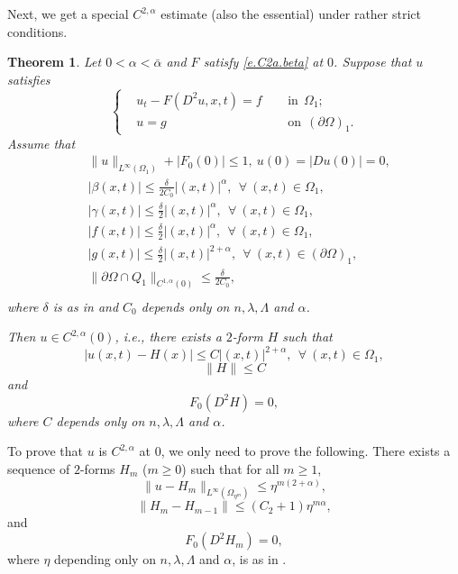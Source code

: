 \documentclass[preprint,12pt]{elsarticle}
\newtheorem{theorem}{Theorem}[section]
\theoremstyle{definition}
\theoremstyle{remark}
\numberwithin{equation}{section}
\begin{document}
Next, we get a special $C^{2,\alpha}$ estimate (also the essential) under rather strict conditions.
\begin{theorem}\label{t-C2a.S}
Let $0<\alpha <\bar{\alpha}$ and $F$ satisfy \cref{e.C2a.beta} at $0$. Suppose that $u$ satisfies
\begin{equation*}
\left\{\begin{aligned}
&u_t-F(D^2u,x,t)=f&& ~~\mbox{in}~~\Omega_1;\\
&u=g&& ~~\mbox{on}~~(\partial \Omega)_1.
\end{aligned}\right.
\end{equation*}
Assume that
\begin{equation}\label{e.C2a.S.be}
\begin{aligned}
&\|u\|_{L^{\infty}(\Omega_1)}+|F_0(0)|\leq 1,~ u(0)=|Du(0)|=0, \\
&|\beta(x,t)|\leq \frac{\delta}{2C_0} |(x,t)|^{\alpha}, ~~\forall ~(x,t)\in \Omega_1,\\
&|\gamma(x,t)|\leq \frac{\delta}{2} |(x,t)|^{\alpha}, ~~\forall ~(x,t)\in \Omega_1,\\
&|f(x,t)|\leq \frac{\delta}{2} |(x,t)|^{\alpha}, ~~\forall ~(x,t)\in \Omega_1,\\
&|g(x,t)|\leq \frac{\delta}{2}|(x,t)|^{2+\alpha}, ~~\forall ~(x,t)\in (\partial \Omega)_1,\\
&\|\partial \Omega\cap Q_1\|_{C^{1,\alpha}(0)} \leq \frac{\delta}{2C_0},\\
\end{aligned}
\end{equation}
where $\delta$ is as in  and $C_0$ depends only on $n,\lambda,\Lambda$ and $\alpha$.

Then $u\in C^{2,\alpha}(0)$, i.e., there exists a $2$-form $H$ such that
\begin{equation}\label{e.C2a.S1}
  |u(x,t)-H(x)|\leq C |(x,t)|^{2+\alpha}, ~~\forall ~(x,t)\in \Omega_{1},
\end{equation}
\begin{equation}\label{e.C2a.S3}
\|H\| \leq C
\end{equation}
and
\begin{equation}\label{e.C2a.S2}
F_0(D^2 H)=0,
\end{equation}
where $C$ depends only on $n, \lambda, \Lambda$ and $\alpha$.
\end{theorem}

\proof To prove that $u$ is $C^{2,\alpha}$ at $0$, we only need to prove the following. There exists a sequence of $2$-forms $H_m$ ($m\geq 0$) such that for all $m\geq 1$,
\begin{equation}\label{e.C2a.S4}
\|u-H_m\|_{L^{\infty }(\Omega_{\eta^{m}})}\leq \eta ^{m(2+\alpha )},
\end{equation}
\begin{equation}\label{e.C2a.S6}
\|H_m-H_{m-1}\|\leq (C_2+1)\eta ^{m\alpha},
\end{equation}
and
\begin{equation}\label{e.C2a.S5}
F_0(D^2 H_m)=0,
\end{equation}
where $\eta$ depending only on $n,\lambda,\Lambda$ and $\alpha$, is as in .
\end{document}
